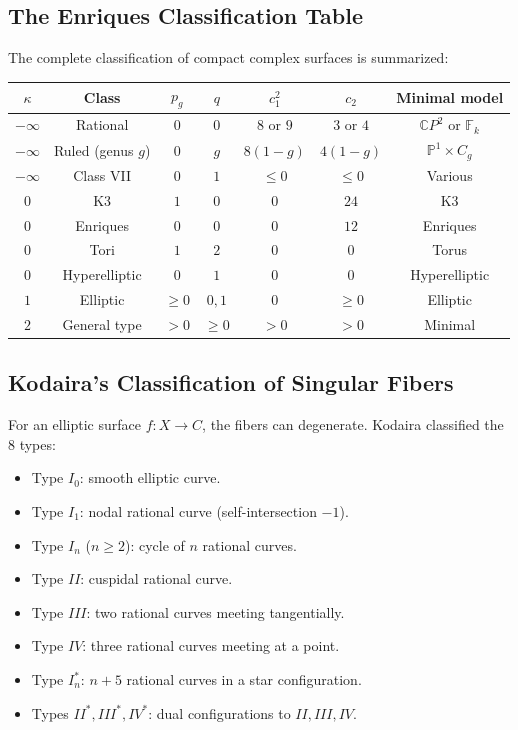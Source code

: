 \subsection{The Enriques Classification Table}

The complete classification of compact complex surfaces is summarized:

\begin{center}
\begin{tabular}{|c|c|c|c|c|c|c|}
\hline
$\kappa$ & Class & $p_g$ & $q$ & $c_1^2$ & $c_2$ & Minimal model \\ \hline
$-\infty$ & Rational & $0$ & $0$ & $8$ or $9$ & $3$ or $4$ & $\mathbb{C}P^2$ or $\mathbb{F}_k$ \\
$-\infty$ & Ruled (genus $g$) & $0$ & $g$ & $8(1-g)$ & $4(1-g)$ & $\mathbb{P}^1 \times C_g$ \\
$-\infty$ & Class VII & $0$ & $1$ & $\leq 0$ & $\leq 0$ & Various \\ \hline
$0$ & K3 & $1$ & $0$ & $0$ & $24$ & K3 \\
$0$ & Enriques & $0$ & $0$ & $0$ & $12$ & Enriques \\
$0$ & Tori & $1$ & $2$ & $0$ & $0$ & Torus \\
$0$ & Hyperelliptic & $0$ & $1$ & $0$ & $0$ & Hyperelliptic \\ \hline
$1$ & Elliptic & $\geq 0$ & $0,1$ & $0$ & $\geq 0$ & Elliptic \\ \hline
$2$ & General type & $> 0$ & $\geq 0$ & $> 0$ & $> 0$ & Minimal \\ \hline
\end{tabular}
\end{center}

\subsection{Kodaira's Classification of Singular Fibers}

For an elliptic surface $f: X \to C$, the fibers can degenerate. Kodaira classified the 8 types:
\begin{itemize}
    \item Type $I_0$: smooth elliptic curve.
    \item Type $I_1$: nodal rational curve (self-intersection $-1$).
    \item Type $I_n$ ($n \geq 2$): cycle of $n$ rational curves.
    \item Type $II$: cuspidal rational curve.
    \item Type $III$: two rational curves meeting tangentially.
    \item Type $IV$: three rational curves meeting at a point.
    \item Type $I_n^*$: $n+5$ rational curves in a star configuration.
    \item Types $II^*, III^*, IV^*$: dual configurations to $II, III, IV$.
\end{itemize}

